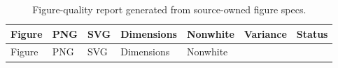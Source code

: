 \documentclass[
]{article}
\begin{document}
\begin{longtable}[]{@{}
  >{\raggedright\arraybackslash}p{}
  >{\raggedright\arraybackslash}p{}
  >{\raggedright\arraybackslash}p{}
  >{\raggedright\arraybackslash}p{}
  >{\raggedright\arraybackslash}p{}
  >{\raggedright\arraybackslash}p{}
  >{\raggedright\arraybackslash}p{}@{}}
\caption{Figure-quality report generated from source-owned figure
specs.}\label{tbl:figure_quality}\tabularnewline
\toprule\noalign{}
\begin{minipage}[b]{\linewidth}\raggedright
Figure
\end{minipage} & \begin{minipage}[b]{\linewidth}\raggedright
PNG
\end{minipage} & \begin{minipage}[b]{\linewidth}\raggedright
SVG
\end{minipage} & \begin{minipage}[b]{\linewidth}\raggedright
Dimensions
\end{minipage} & \begin{minipage}[b]{\linewidth}\raggedright
Nonwhite
\end{minipage} & \begin{minipage}[b]{\linewidth}\raggedright
Variance
\end{minipage} & \begin{minipage}[b]{\linewidth}\raggedright
Status
\end{minipage} \\
\midrule\noalign{}
\endfirsthead
\toprule\noalign{}
\begin{minipage}[b]{\linewidth}\raggedright
Figure
\end{minipage} & \begin{minipage}[b]{\linewidth}\raggedright
PNG
\end{minipage} & \begin{minipage}[b]{\linewidth}\raggedright
SVG
\end{minipage} & \begin{minipage}[b]{\linewidth}\raggedright
Dimensions
\end{minipage} & \begin{minipage}[b]{\linewidth}\raggedright
Nonwhite
\end{minipage} & \begin{minipage}[b]{\linewidth}\raggedright

\end{minipage}
\end{longtable}
\end{document}
